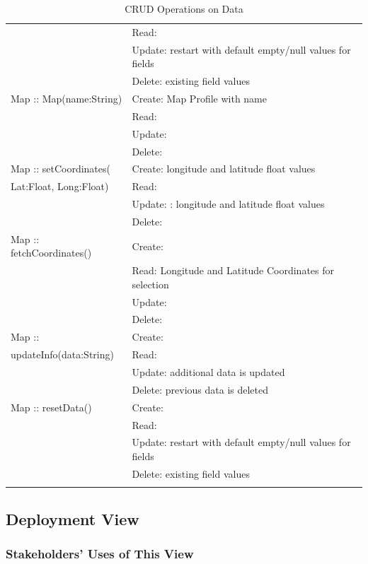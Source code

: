 \begin{longtable}{|p{.3\linewidth}|p{.7\linewidth}|}
                & Read: \\
               & Update: restart with default empty/null values for fields\\
               & Delete: existing field values\\ \hline
    Map :: Map(name:String) & Create: Map Profile with name  \\
                & Read: \\
               & Update: \\
               & Delete: \\ \hline
    Map :: setCoordinates( & Create: longitude and latitude float values \\
    Lat:Float, Long:Float) & Read: \\
               & Update: : longitude and latitude float values \\
               & Delete: \\ \hline
    Map :: fetchCoordinates() & Create:  \\
                & Read: Longitude and Latitude Coordinates for selection\\
               & Update: \\
               & Delete: \\ \hline
    Map :: & Create:  \\
    updateInfo(data:String) & Read: \\
               & Update: additional data is updated\\
               & Delete: previous data is deleted\\ \hline
    Map ::  resetData() & Create:  \\
                & Read: \\
               & Update: restart with default empty/null values for fields \\
               & Delete: existing field values \\ \hline
  \caption{CRUD Operations on Data}
\end{longtable}

\subsection{Deployment View}

\subsubsection{Stakeholders' Uses of This View}

